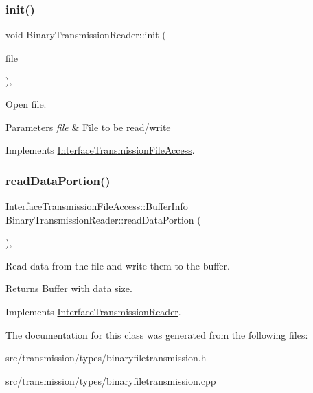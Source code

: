 \subsubsection{\texorpdfstring{init()}{init()}}
{\footnotesize\ttfamily void Binary\+Transmission\+Reader\+::init (\begin{DoxyParamCaption}\item[{const Q\+File \&}]{file }\end{DoxyParamCaption})\hspace{0.3cm}{\ttfamily [override]}, {\ttfamily [virtual]}}



Open file. 


\begin{DoxyParams}{Parameters}
{\em file} & File to be read/write \\
\hline
\end{DoxyParams}


Implements \hyperlink{classInterfaceTransmissionFileAccess_a8c423ccb527b1dda62c798a75b6eb690}{Interface\+Transmission\+File\+Access}.

\mbox{\label{classBinaryTransmissionReader_a003a0b7a500a15ddfc573e6f54006b0c}} 
\subsubsection{\texorpdfstring{read\+Data\+Portion()}{readDataPortion()}}
{\footnotesize\ttfamily Interface\+Transmission\+File\+Access\+::\+Buffer\+Info Binary\+Transmission\+Reader\+::read\+Data\+Portion (\begin{DoxyParamCaption}{ }\end{DoxyParamCaption})\hspace{0.3cm}{\ttfamily [override]}, {\ttfamily [virtual]}}



Read data from the file and write them to the buffer. 

\begin{DoxyReturn}{Returns}
Buffer with data size. 
\end{DoxyReturn}


Implements \hyperlink{classInterfaceTransmissionReader_ab8733fbc3a4f6dc8279c363212fd3f51}{Interface\+Transmission\+Reader}.



The documentation for this class was generated from the following files\+:\begin{DoxyCompactItemize}
\item 
src/transmission/types/binaryfiletransmission.\+h\item 
src/transmission/types/binaryfiletransmission.\+cpp\end{DoxyCompactItemize}
